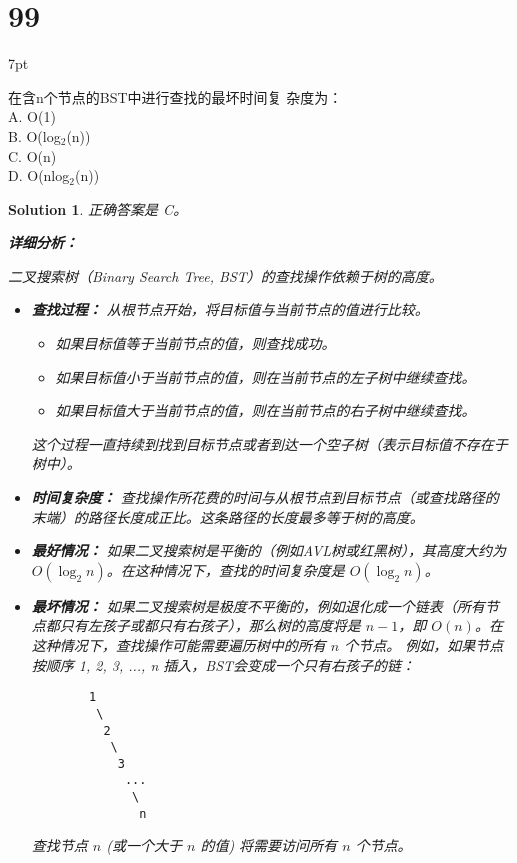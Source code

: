 \documentclass[UTF8]{report}
\newtheorem{solution}{Solution}
\theoremstyle{MyLineTheoremStyle} %
\theoremstyle{MyBlockTheoremStyle} %
\theoremstyle{MySubsubsectionStyle} %
\newenvironment{graybox}{%
        \def\FrameCommand{%
        \hspace{1pt}%
        {\color{gray}\small \vrule width 2pt}%
        {\color{graybox_color}\vrule width 4pt}%
        \colorbox{graybox_color}%
        }%
        \MakeFramed{\advance\hsize-\width\FrameRestore}%
        \noindent\hspace{-4.55pt}%
        \begin{adjustwidth}{}{7pt}%
        \vspace{2pt}\vspace{2pt}%
        }
        {%
        \vspace{2pt}\end{adjustwidth}\endMakeFramed%
        }
\begin{document}
\section*{99}
\begin{graybox}
在含n个节点的BST中进行查找的最坏时间复
杂度为： \\
A. O(1) \\
B. O(log$_{2}$(n)) \\
C. O(n) \\
D. O(nlog$_{2}$(n))
\end{graybox}

\begin{solution}
正确答案是 C。

\textbf{详细分析：}

二叉搜索树（Binary Search Tree, BST）的查找操作依赖于树的高度。
\begin{itemize}
    \item \textbf{查找过程：} 从根节点开始，将目标值与当前节点的值进行比较。
        \begin{itemize}
            \item 如果目标值等于当前节点的值，则查找成功。
            \item 如果目标值小于当前节点的值，则在当前节点的左子树中继续查找。
            \item 如果目标值大于当前节点的值，则在当前节点的右子树中继续查找。
        \end{itemize}
        这个过程一直持续到找到目标节点或者到达一个空子树（表示目标值不存在于树中）。

    \item \textbf{时间复杂度：} 查找操作所花费的时间与从根节点到目标节点（或查找路径的末端）的路径长度成正比。这条路径的长度最多等于树的高度。

    \item \textbf{最好情况：} 如果二叉搜索树是平衡的（例如AVL树或红黑树），其高度大约为 $O(\log_2 n)$。在这种情况下，查找的时间复杂度是 $O(\log_2 n)$。

    \item \textbf{最坏情况：} 如果二叉搜索树是极度不平衡的，例如退化成一个链表（所有节点都只有左孩子或都只有右孩子），那么树的高度将是 $n-1$，即 $O(n)$。在这种情况下，查找操作可能需要遍历树中的所有 $n$ 个节点。
        例如，如果节点按顺序 1, 2, 3, ..., n 插入，BST会变成一个只有右孩子的链：
        \begin{verbatim}
        1
         \
          2
           \
            3
             ...
              \
               n
        \end{verbatim}
        查找节点 $n$ (或一个大于 $n$ 的值) 将需要访问所有 $n$ 个节点。


\end{itemize}
\end{solution}
\end{document}
